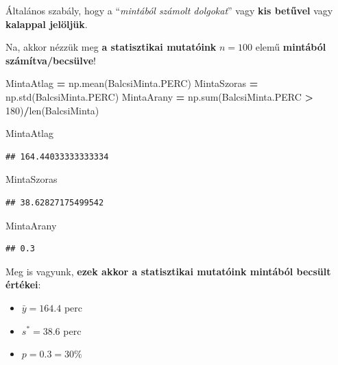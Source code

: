 \documentclass[
]{book}
\newenvironment{Shaded}{\begin{snugshade}}{\end{snugshade}}
\newcommand{\BuiltInTok}[1]{#1}
\newcommand{\DecValTok}[1]{\textcolor[rgb]{0.00,0.00,0.81}{#1}}
\newcommand{\NormalTok}[1]{#1}
\newcommand{\OperatorTok}[1]{\textcolor[rgb]{0.81,0.36,0.00}{\textbf{#1}}}
\providecommand{\tightlist}{%
  \setlength{\itemsep}{0pt}\setlength{\parskip}{0pt}}
\begin{document}
Általános szabály, hogy a ``\emph{mintából számolt dolgokat}'' vagy \textbf{kis betűvel} vagy \textbf{kalappal jelöljük}.

Na, akkor nézzük meg \textbf{a statisztikai mutatóink} \(n = 100\) elemű \textbf{mintából számítva/becsülve}!

\begin{Shaded}
\begin{Highlighting}[]
\NormalTok{MintaAtlag }\OperatorTok{=}\NormalTok{ np.mean(BalcsiMinta.PERC)}
\NormalTok{MintaSzoras }\OperatorTok{=}\NormalTok{ np.std(BalcsiMinta.PERC)}
\NormalTok{MintaArany }\OperatorTok{=}\NormalTok{ np.}\BuiltInTok{sum}\NormalTok{(BalcsiMinta.PERC }\OperatorTok{\textgreater{}} \DecValTok{180}\NormalTok{)}\OperatorTok{/}\BuiltInTok{len}\NormalTok{(BalcsiMinta)}

\NormalTok{MintaAtlag}
\end{Highlighting}
\end{Shaded}

\begin{verbatim}
## 164.44033333333334
\end{verbatim}

\begin{Shaded}
\begin{Highlighting}[]
\NormalTok{MintaSzoras}
\end{Highlighting}
\end{Shaded}

\begin{verbatim}
## 38.62827175499542
\end{verbatim}

\begin{Shaded}
\begin{Highlighting}[]
\NormalTok{MintaArany}
\end{Highlighting}
\end{Shaded}

\begin{verbatim}
## 0.3
\end{verbatim}

Meg is vagyunk, \textbf{ezek akkor a statisztikai mutatóink mintából becsült értékei}:

\begin{itemize}
\tightlist
\item
  \(\bar{y}=164.4\) perc
\item
  \(s^* = 38.6\) perc
\item
  \(p = 0.3=30\%\)
\end{itemize}
\end{document}
